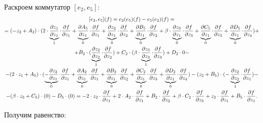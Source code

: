\documentclass{article}
\begin{document}
Раскроем коммутатор $[e_{2}, e_{5}]$:
\begin{equation*}
\begin{gathered}
$[$e_{2}, e_{5}$]$(f) = e_{2}(e_{5})(f) - e_{5}(e_{2})(f) =
\\ = (-z_{2} + A_{2}) \cdot (2 \cdot \underbrace{\frac{\partial z_{1}}{\partial z_{1}}}_{1} \cdot \frac{\partial f}{\partial z_{1}}
 + \underbrace{\frac{\partial A_{5}}{\partial z_{1}}}_{0} \cdot \frac{\partial f}{\partial z_{1}}
  + \underbrace{\frac{\partial z_{2}}{\partial z_{1}}}_{0} \cdot \frac{\partial f}{\partial z_{2}}
   + \underbrace{\frac{\partial B_{5}}{\partial z_{1}}}_{0} \cdot \frac{\partial f}{\partial z_{2}}
    + \beta \cdot \underbrace{\frac{\partial z_{3}}{\partial z_{1}}}_{0} \cdot \frac{\partial f}{\partial z_{3}}
     + \underbrace{\frac{\partial C_{5}}{\partial z_{1}}}_{0} \cdot \frac{\partial f}{\partial z_{3}}
      + \underbrace{\frac{\partial D_{5}}{\partial z_{1}}}_{0} \cdot \frac{\partial f}{\partial z_{4}}) +
 \\ + B_{2} \cdot (\underbrace{\frac{\partial z_{2}}{\partial z_{2}}}_{1} \cdot \frac{\partial f}{\partial z_{2}})
  + C_{2} \cdot (\beta \cdot \underbrace{\frac{\partial z_{3}}{\partial z_{3}}}_{1} \cdot \frac{\partial f}{\partial z_{3}}) + D_{2} \cdot 0 -
 \\ - (2 \cdot z_{1} + A_{5}) \cdot (\underbrace{-\frac{\partial z_{2}}{\partial z_{1}}}_{0} \cdot \frac{\partial f}{\partial z_{1}}
  + \underbrace{\frac{\partial A_{2}}{\partial z_{1}}}_{0} \cdot \frac{\partial f}{\partial z_{1}}
   + \underbrace{\frac{\partial B_{2}}{\partial z_{1}}}_{0} \cdot \frac{\partial f}{\partial z_{2}}
    + \underbrace{\frac{\partial C_{2}}{\partial z_{1}}}_{0} \cdot \frac{\partial f}{\partial z_{3}}
     + \underbrace{\frac{\partial D_{2}}{\partial z_{1}}}_{0} \cdot \frac{\partial f}{\partial z_{4}}) - (z_{2} + B_{5}) \cdot (-\underbrace{\frac{\partial z_{2}}{\partial z_{2}}}_{1} \cdot \frac{\partial f}{\partial z_{1}}) -
\\ - (\beta \cdot z_{3} + C_{5}) \cdot (0) - D_{5} \cdot (0)
 = -2 \cdot z_{2} \cdot \frac{\partial f}{\partial z_{1}}
  + 2 \cdot A_{2} \cdot \frac{\partial f}{\partial z_{1}}
   + B_{2} \cdot \frac{\partial f}{\partial z_{2}}
    + \beta \cdot  C_{2} \cdot \frac{\partial f}{\partial z_{3}}
     + z_{2} \cdot \frac{\partial f}{\partial z_{1}}
      + B_{5} \cdot \frac{\partial f}{\partial z_{1}}.
\end{gathered}
\end{equation*}

Получим равенство:
\end{document}
